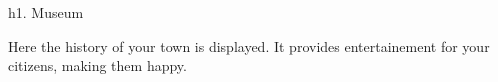 h1. Museum

Here the history of your town is displayed. It provides entertainement for your citizens, making them happy.